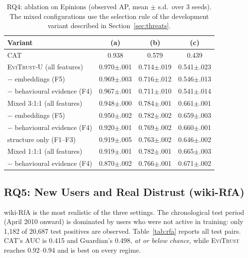 \documentclass[conference]{IEEEtran}
\newcommand{\evi}{\textsc{EviTrust}}
\newcommand{\eviU}{\textsc{EviTrust}-U}
\begin{document}
\begin{table}[t]
\centering
\caption{RQ4: ablation on Epinions (observed AP, mean $\pm$ s.d.\ over 3 seeds). The mixed configurations use the selection rule of the development variant described in Section~\ref{sec:threats}.}
\label{tab:ablation}
\setlength{\tabcolsep}{2.4pt}
\begin{tabular}{lccc}
\toprule
Variant & (a) & (b) & (c) \\
\midrule
CAT & 0.938 & 0.579 & 0.439 \\
\midrule
\eviU{} (all features) & 0.970$\pm$.001 & 0.714$\pm$.019 & 0.541$\pm$.023 \\
\quad $-$ embeddings (F5) & 0.969$\pm$.003 & 0.716$\pm$.012 & 0.546$\pm$.013 \\
\quad $-$ behavioural evidence (F4) & 0.967$\pm$.001 & 0.711$\pm$.010 & 0.541$\pm$.014 \\
\midrule
Mixed 3:1:1 (all features) & 0.948$\pm$.000 & 0.784$\pm$.001 & 0.661$\pm$.001 \\
\quad $-$ embeddings (F5) & 0.950$\pm$.002 & 0.782$\pm$.002 & 0.659$\pm$.003 \\
\quad $-$ behavioural evidence (F4) & 0.920$\pm$.001 & 0.769$\pm$.002 & 0.660$\pm$.001 \\
\quad structure only (F1--F3) & 0.919$\pm$.005 & 0.763$\pm$.002 & 0.646$\pm$.002 \\
\midrule
Mixed 1:1:1 (all features) & 0.919$\pm$.001 & 0.782$\pm$.001 & 0.665$\pm$.003 \\
\quad $-$ behavioural evidence (F4) & 0.870$\pm$.002 & 0.766$\pm$.001 & 0.671$\pm$.002 \\
\bottomrule
\end{tabular}
\end{table}

\subsection{RQ5: New Users and Real Distrust (wiki-RfA)}

wiki-RfA is the most realistic of the three settings. The chronological test period (April 2010 onward) is dominated by users who were not active in training: only 1{,}182 of 20{,}687 test positives are observed. Table~\ref{tab:rfa} reports all test pairs. CAT's AUC is 0.415 and Guardian's 0.498, \emph{at or below chance}, while \evi{} reaches 0.92--0.94 and is best on every regime.
\end{document}
